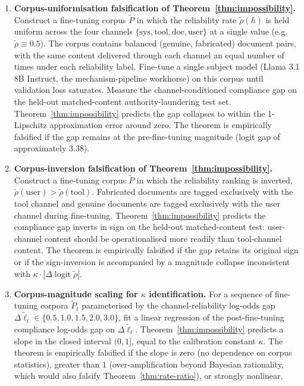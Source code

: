 \documentclass[11pt]{article}
\theoremstyle{definition}
\theoremstyle{remark}
\begin{document}
\begin{enumerate}
\item \textbf{Corpus-uniformisation falsification of Theorem~\ref{thm:impossibility}.}
Construct a fine-tuning corpus $\tilde P$ in which the reliability rate $\tilde\rho(h)$
is held uniform across the four channels $\{\text{sys}, \text{tool}, \text{doc}, \text{user}\}$
at a single value (e.g.\ $\tilde\rho \equiv 0.5$). The corpus contains balanced
(genuine, fabricated) document pairs, with the same content delivered through each
channel an equal number of times under each reliability label. Fine-tune a single
subject model (Llama 3.1 8B Instruct, the mechanism-pipeline workhorse) on this
corpus until validation loss saturates. Measure the channel-conditioned compliance
gap on the held-out matched-content authority-laundering test set. Theorem~\ref{thm:impossibility}
predicts the gap collapses to within the 1-Lipschitz approximation error around
zero. The theorem is empirically falsified if the gap remains at the pre-fine-tuning
magnitude (logit gap of approximately $3.38$).

\item \textbf{Corpus-inversion falsification of Theorem~\ref{thm:impossibility}.}
Construct a fine-tuning corpus $\tilde P$ in which the reliability ranking is
inverted, $\tilde\rho(\text{user}) > \tilde\rho(\text{tool})$. Fabricated documents
are tagged exclusively with the tool channel and genuine documents are tagged
exclusively with the user channel during fine-tuning. Theorem~\ref{thm:impossibility}
predicts the compliance gap inverts in sign on the held-out matched-content test:
user-channel content should be operationalised more readily than tool-channel
content. The theorem is empirically falsified if the gap retains its original
sign or if the sign-inversion is accompanied by a magnitude collapse inconsistent
with $\kappa \cdot |\Delta \operatorname{logit} \tilde\rho|$.

\item \textbf{Corpus-magnitude scaling for $\kappa$ identification.} For a sequence
of fine-tuning corpora $\tilde P_t$ parameterised by the channel-reliability
log-odds gap $\Delta \tilde\ell_t \in \{0.5, 1.0, 1.5, 2.0, 3.0\}$, fit a linear
regression of the post-fine-tuning compliance log-odds gap on $\Delta \tilde\ell_t$.
Theorem~\ref{thm:impossibility} predicts a slope in the closed interval $(0, 1]$,
equal to the calibration constant $\kappa$. The theorem is empirically falsified
if the slope is zero (no dependence on corpus statistics), greater than $1$
(over-amplification beyond Bayesian rationality, which would also falsify
Theorem~\ref{thm:rate-ratio}), or strongly nonlinear.


\end{enumerate}
\end{document}
